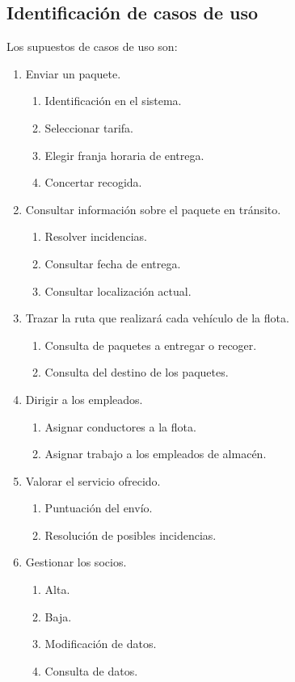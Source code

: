 \documentclass[12pt,spanish]{article}
\begin{document}
\subsection{Identificación de casos de uso}
Los supuestos de casos de uso son:
\begin{enumerate}[label=\textbf{CU-\arabic*}]
	\item Enviar un paquete.
	\begin{enumerate}[label=\textbf{CU-1.\arabic*}]	
		\item Identificación en el sistema.
		\item Seleccionar tarifa.
		\item Elegir franja horaria de entrega.
		\item Concertar recogida.
	\end{enumerate}
	\item Consultar información sobre el paquete en tránsito.
	\begin{enumerate}[label=\textbf{CU-2.\arabic*}]
		\item Resolver incidencias.
		\item Consultar fecha de entrega.
		\item Consultar localización actual.
	\end{enumerate}
	\item Trazar la ruta que realizará cada vehículo de la flota.
	\begin{enumerate}[label=\textbf{CU-3.\arabic*}]
		\item Consulta de paquetes a entregar o recoger.
		\item Consulta del destino de los paquetes.	
	\end{enumerate}
	\item Dirigir a los empleados.
	\begin{enumerate}[label=\textbf{CU-4.\arabic*}]
		\item Asignar conductores a la flota.
		\item Asignar trabajo a los empleados de almacén.	
	\end{enumerate}
	\item Valorar el servicio ofrecido.
	\begin{enumerate}[label=\textbf{CU-5.\arabic*}]
		\item Puntuación del envío.
		\item Resolución de posibles incidencias.
	\end{enumerate}
	\item Gestionar los socios.
	\begin{enumerate}[label=\textbf{CU-6.\arabic*}]
		\item Alta.
		\item Baja.
		\item Modificación de datos.
		\item Consulta de datos.
	\end{enumerate}

\end{enumerate}
\end{document}
